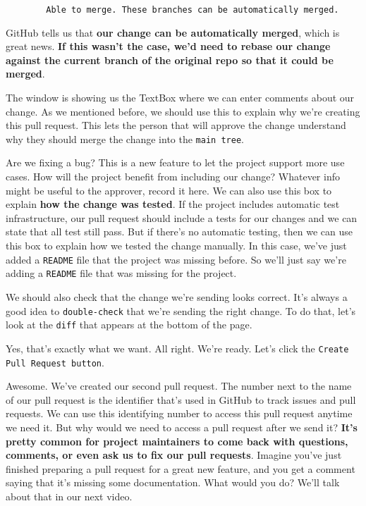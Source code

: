 	\begin{verbatim}
		Able to merge. These branches can be automatically merged.
	\end{verbatim}
	
	GitHub tells us that \textbf{our change can be automatically merged}, which is great news. \textbf{If this wasn't the case, we'd need to rebase our change against the current branch of the original repo so that it could be merged}. 
	
	The window is showing us the TextBox where we can enter comments about our change. As we mentioned before, we should use this to explain why we're creating this pull request. This lets the person that will approve the change understand why they should merge the change into the \texttt{main tree}. 
	
	Are we fixing a bug? This is a new feature to let the project support more use cases. How will the project benefit from including our change? Whatever info might be useful to the approver, record it here. We can also use this box to explain \textbf{how the change was tested}. If the project includes automatic test infrastructure, our pull request should include a tests for our changes and we can state that all test still pass. But if there's no automatic testing, then we can use this box to explain how we tested the change manually. In this case, we've just added a \texttt{README} file that the project was missing before. So we'll just say we're adding a \texttt{README} file that was missing for the project.
	
	We should also check that the change we're sending looks correct. It's always a good idea to \verb|double-check| that we're sending the right change. To do that, let's look at the \texttt{diff} that appears at the bottom of the page.
	
	Yes, that's exactly what we want. All right. We're ready. Let's click the \texttt{Create Pull Request button}.
	
	Awesome. We've created our second pull request. The number next to the name of our pull request is the identifier that's used in GitHub to track issues and pull requests. We can use this identifying number to access this pull request anytime we need it. But why would we need to access a pull request after we send it? \textbf{It's pretty common for project maintainers to come back with questions, comments, or even ask us to fix our pull requests}. Imagine you've just finished preparing a pull request for a great new feature, and you get a comment saying that it's missing some documentation. What would you do? We'll talk about that in our next video.
	
